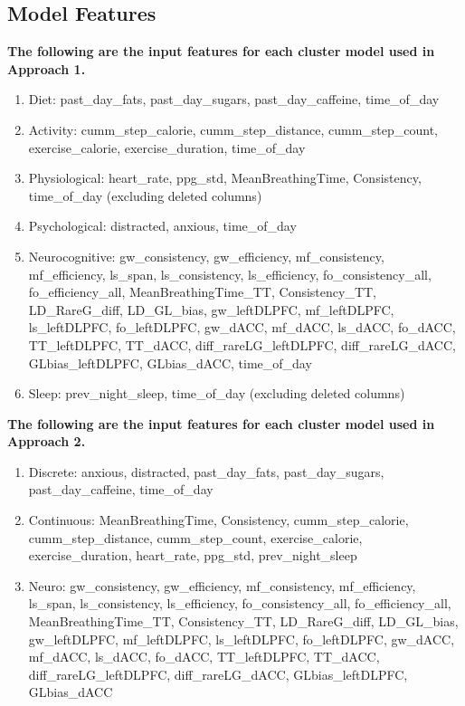 \subsection{Model Features}
\label{sec:appendix_model_features}
\textbf{The following are the input features for each cluster model used in Approach 1.}
\begin{enumerate}
    \item Diet: past\_day\_fats, past\_day\_sugars, past\_day\_caffeine, time\_of\_day
    \item Activity: cumm\_step\_calorie, cumm\_step\_distance, cumm\_step\_count, exercise\_calorie, exercise\_duration, time\_of\_day
    \item Physiological: heart\_rate, ppg\_std, MeanBreathingTime, Consistency, time\_of\_day (excluding deleted columns)
    \item Psychological: distracted, anxious, time\_of\_day
    \item Neurocognitive: gw\_consistency, gw\_efficiency, mf\_consistency, mf\_efficiency, ls\_span, ls\_consistency, ls\_efficiency, fo\_consistency\_all, fo\_efficiency\_all, MeanBreathingTime\_TT, Consistency\_TT, LD\_RareG\_diff, LD\_GL\_bias, gw\_leftDLPFC, mf\_leftDLPFC, ls\_leftDLPFC, fo\_leftDLPFC, gw\_dACC, mf\_dACC, ls\_dACC, fo\_dACC, TT\_leftDLPFC, TT\_dACC, diff\_rareLG\_leftDLPFC, diff\_rareLG\_dACC, GLbias\_leftDLPFC, GLbias\_dACC, time\_of\_day
    \item Sleep: prev\_night\_sleep, time\_of\_day (excluding deleted columns)
\end{enumerate}

\textbf{The following are the input features for each cluster model used in Approach 2.}
\begin{enumerate}
    \item Discrete: anxious, distracted, past\_day\_fats, past\_day\_sugars, past\_day\_caffeine, time\_of\_day
    \item Continuous: MeanBreathingTime, Consistency, cumm\_step\_calorie, cumm\_step\_distance, cumm\_step\_count, exercise\_calorie, exercise\_duration, heart\_rate, ppg\_std, prev\_night\_sleep
    \item Neuro: gw\_consistency, gw\_efficiency, mf\_consistency, mf\_efficiency, ls\_span, ls\_consistency, ls\_efficiency, fo\_consistency\_all, fo\_efficiency\_all, MeanBreathingTime\_TT, Consistency\_TT, LD\_RareG\_diff, LD\_GL\_bias, gw\_leftDLPFC, mf\_leftDLPFC, ls\_leftDLPFC, fo\_leftDLPFC, gw\_dACC, mf\_dACC, ls\_dACC, fo\_dACC, TT\_leftDLPFC, TT\_dACC, diff\_rareLG\_leftDLPFC, diff\_rareLG\_dACC, GLbias\_leftDLPFC, GLbias\_dACC
\end{enumerate}

